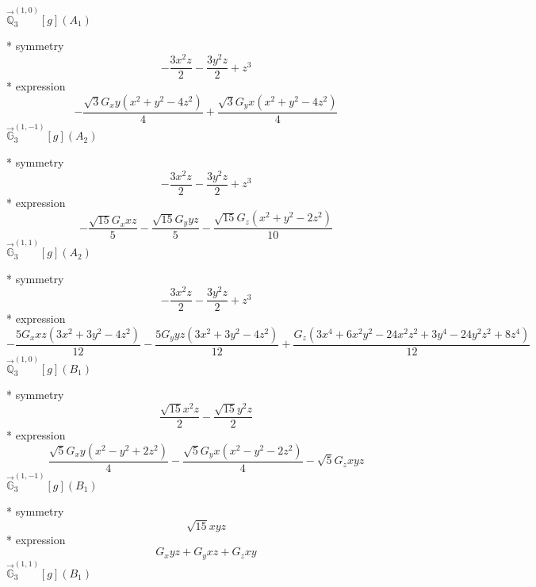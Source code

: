 \documentclass[fleqn,8pt]{jsarticle}
\begin{document}
\noindent\quad $\vec{\mathbb{Q}}_{3}^{(1,0)}[g](A_{1})$

\noindent\quad ** symmetry
\begin{dmath*}
- \frac{3 x^{2} z}{2} - \frac{3 y^{2} z}{2} + z^{3}
\end{dmath*}
\noindent\quad ** expression
\begin{dmath*}
- \frac{\sqrt{3} G_{x} y \left(x^{2} + y^{2} - 4 z^{2}\right)}{4} + \frac{\sqrt{3} G_{y} x \left(x^{2} + y^{2} - 4 z^{2}\right)}{4}
\end{dmath*}
\noindent\quad $\vec{\mathbb{G}}_{3}^{(1,-1)}[g](A_{2})$

\noindent\quad ** symmetry
\begin{dmath*}
- \frac{3 x^{2} z}{2} - \frac{3 y^{2} z}{2} + z^{3}
\end{dmath*}
\noindent\quad ** expression
\begin{dmath*}
- \frac{\sqrt{15} G_{x} x z}{5} - \frac{\sqrt{15} G_{y} y z}{5} - \frac{\sqrt{15} G_{z} \left(x^{2} + y^{2} - 2 z^{2}\right)}{10}
\end{dmath*}
\noindent\quad $\vec{\mathbb{G}}_{3}^{(1,1)}[g](A_{2})$

\noindent\quad ** symmetry
\begin{dmath*}
- \frac{3 x^{2} z}{2} - \frac{3 y^{2} z}{2} + z^{3}
\end{dmath*}
\noindent\quad ** expression
\begin{dmath*}
- \frac{5 G_{x} x z \left(3 x^{2} + 3 y^{2} - 4 z^{2}\right)}{12} - \frac{5 G_{y} y z \left(3 x^{2} + 3 y^{2} - 4 z^{2}\right)}{12} + \frac{G_{z} \left(3 x^{4} + 6 x^{2} y^{2} - 24 x^{2} z^{2} + 3 y^{4} - 24 y^{2} z^{2} + 8 z^{4}\right)}{12}
\end{dmath*}
\noindent\quad $\vec{\mathbb{Q}}_{3}^{(1,0)}[g](B_{1})$

\noindent\quad ** symmetry
\begin{dmath*}
\frac{\sqrt{15} x^{2} z}{2} - \frac{\sqrt{15} y^{2} z}{2}
\end{dmath*}
\noindent\quad ** expression
\begin{dmath*}
\frac{\sqrt{5} G_{x} y \left(x^{2} - y^{2} + 2 z^{2}\right)}{4} - \frac{\sqrt{5} G_{y} x \left(x^{2} - y^{2} - 2 z^{2}\right)}{4} - \sqrt{5} G_{z} x y z
\end{dmath*}
\noindent\quad $\vec{\mathbb{G}}_{3}^{(1,-1)}[g](B_{1})$

\noindent\quad ** symmetry
\begin{dmath*}
\sqrt{15} x y z
\end{dmath*}
\noindent\quad ** expression
\begin{dmath*}
G_{x} y z + G_{y} x z + G_{z} x y
\end{dmath*}
\noindent\quad $\vec{\mathbb{G}}_{3}^{(1,1)}[g](B_{1})$
\end{document}

